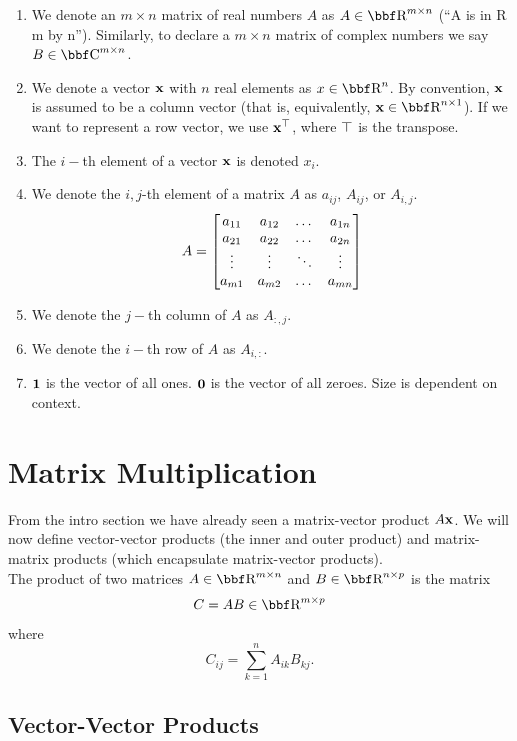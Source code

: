 \documentclass{article}
\begin{document}
\begin{enumerate}[-]
    \item We denote an $m\times n$ matrix of real numbers $A$ as $A\in\RR^{m\times n}$
        (``A is in R m by n'').
        Similarly, to declare a $m\times n$ matrix of complex numbers we say $B\in\CC^{m\times n}$.
    \item We denote a vector ${\bf x}$ with $n$ real elements as $x\in\RR^n$. By convention, ${\bf x}$
        is assumed to be a column vector (that is, equivalently, $\xx\in\RR^{n\times 1}$).
        If we want to represent a row vector, we use ${\bf x}^\top$, where $\top$ is the transpose.
    \item The $i-$th element of a vector ${\bf x}$ is denoted $x_i$.
    \item We denote the $i,j$-th element of a matrix $A$ as $a_{ij}$, $A_{ij}$, or
        $A_{i,j}$.
        \[
            A = \begin{bmatrix} a_{11} & a_{12}&\dots&a_{1n} \\ a_{21} & a_{22} & \dots & a_{2n}\\ \vdots&\vdots&\ddots&\vdots\\a_{m1}&a_{m2}&\dots&a_{mn} \end{bmatrix}
        \]
    \item We denote the $j-$th column of $A$ as $A_{:,j}$.
    \item We denote the $i-$th row of $A$ as $A_{i,:}$.
    \item ${\bf 1}$ is the vector of all ones. ${\bf 0}$ is the vector of
        all zeroes. Size is dependent on context.
\end{enumerate}

\section{Matrix Multiplication}

From the intro section we have already seen a matrix-vector product $A{\bf x}$. We will
now define vector-vector products (the inner and outer product) and matrix-matrix
products (which encapsulate matrix-vector products).\\

The product of two matrices $A\in\RR^{m\times n}$ and $B\in\RR^{n\times p}$ is
the matrix
\[
    C = AB\in\RR^{m\times p}
\]
where
\[
    C_{ij} = \sum_{k=1}^n A_{ik}B_{kj}.
\]

\subsection{Vector-Vector Products}
\end{document}
